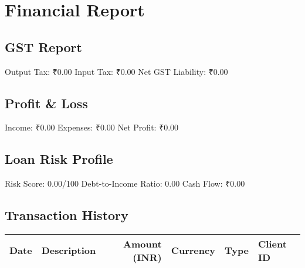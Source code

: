 \documentclass{article}%
\begin{document}
%
\normalsize%
\section{Financial Report}%
\label{sec:FinancialReport}%
\subsection{GST Report}%
\label{subsec:GSTReport}%
Output Tax: ₹0.00\newline%
%
Input Tax: ₹0.00\newline%
%
Net GST Liability: ₹0.00\newline%

%
\subsection{Profit \& Loss}%
\label{subsec:ProfitLoss}%
Income: ₹0.00\newline%
%
Expenses: ₹0.00\newline%
%
Net Profit: ₹0.00\newline%

%
\subsection{Loan Risk Profile}%
\label{subsec:LoanRiskProfile}%
Risk Score: 0.00/100\newline%
%
Debt{-}to{-}Income Ratio: 0.00\newline%
%
Cash Flow: ₹0.00\newline%

%
\subsection{Transaction History}%
\label{subsec:TransactionHistory}%
\begin{longtable}{l l r l l l}%
\hline%
Date&Description&Amount (INR)&Currency&Type&Client ID\\%
\hline%
\hline%
\end{longtable}

%
\end{document}
